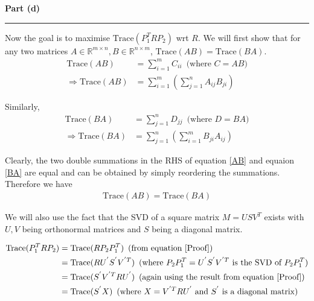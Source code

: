 \documentclass[a4paper,14pt]{article}
\newenvironment{solution}[2][]{%
    \begin{mdframed}[linecolor=blue!70!black, linewidth=2pt, roundcorner=10pt, backgroundcolor=yellow!10!white, skipabove=12pt, skipbelow=12pt]%
        \textbf{\large #2}
        \par\noindent\rule{\textwidth}{0.4pt}
}{
    \end{mdframed}
}
\begin{document}
\begin{solution}{Part (d)}
  Now the goal is to maximise $\text{Trace}(P_{1}^{T}RP_{2})$ wrt $R$.
    We will first show that for any two matrices $A \in \mathbb{R}^{m \times n},B \in \mathbb{R}^{n \times m}$, 
    $\text{Trace}(AB) = \text{Trace}(BA)$.
    \begin{align}
      \text{Trace}(AB) &= \sum\limits_{i = 1}^{m} C_{ii} \, \text{ (where $C = AB$)} \nonumber \\
      \Rightarrow \label{AB} \text{Trace}(AB) &= \sum\limits_{i = 1}^{m} \left(\sum\limits_{j = 1}^{n} A_{ij} B_{ji}\right) 
    \end{align}

    Similarly, 
    \begin{align}
      \text{Trace}(BA) &= \sum\limits_{j = 1}^{n} D_{jj} \, \text{ (where $D = BA$)} \nonumber\\
      \Rightarrow \label{BA}  \text{Trace}(BA) &= \sum\limits_{j = 1}^{n} \left( \sum\limits_{i = 1}^{m} B_{ji} A_{ij}\right)
    \end{align}

    Clearly, the two double summations in the RHS of equation \@\ref{AB} and equaion \@\ref{BA} are equal
    and can be obtained by simply reordering the summations. Therefore we have 
    \begin{align}
      \label{Proof}\text{Trace}(AB) = \text{Trace}(BA)
    \end{align}

    We will also use the fact that the SVD of a square matrix $M = USV^{T}$ exists with $U,V$ being orthonormal matrices 
    and $S$ being a diagonal matrix.

    \begin{align*}
      \text{Trace}(P_{1}^{T}RP_{2}) &= \text{Trace}(RP_{2}P_{1}^{T}) \, \text{ (from equation \@\ref{Proof})} \\
                                    &= \text{Trace}(R U^{'} S^{'} V^{'T}) \, \text{ (where $P_{2}P_{1}^{T} = U^{'} S^{'} V^{'T}$ is the SVD of $P_{2}P_{1}^{T}$)} \\
                                    &= \text{Trace}(S^{'} V^{'T} R U^{'}) \, \text{ (again using the result from equation \@\ref{Proof})} \\
                                    &= \text{Trace}(S^{'} X) \, \text{ (where $X = V^{'T} R U^{'}$ and $S^{'}$ is a diagonal matrix)}
    \end{align*}
\end{solution}
\end{document}
